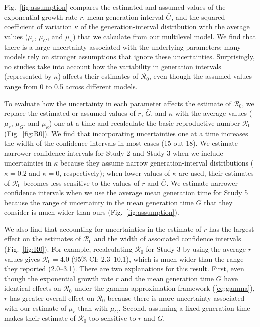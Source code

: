 \documentclass[12pt]{article}
\newcommand{\eref}[1]{(\ref{eq:#1})}
\newcommand{\fref}[1]{Fig.~\ref{fig:#1}}
\begin{document}
\fref{assumption} compares the estimated and assumed values of the exponential growth rate $r$, mean generation interval $\bar G$, and the squared coefficient of variation $\kappa$ of the generation-interval distribution with the average values ($\mu_r$, $\mu_G$, and $\mu_\kappa$) that we calculate from our multilevel model.
We find that there is a large uncertainty associated with the underlying parameters;
many models rely on stronger assumptions that ignore these uncertainties.
Surprisingly, no studies take into account how the variability in generation intervals (represented by $\kappa$) affects their estimates of $\mathcal R_0$, even though the assumed values range from 0 to 0.5 across different models.

To evaluate how the uncertainty in each parameter affects the estimate of $\mathcal R_0$,
we replace the estimated or assumed values of $r$, $\bar G$, and $\kappa$ with the average values ($\mu_r$, $\mu_G$, and $\mu_\kappa$) one at a time and recalculate the basic reproductive number $\mathcal R_0$ (\fref{R0}).
We find that incorporating uncertainties one at a time increases the width of the confidence intervals in most cases (15 out 18).
We estimate narrower confidence intervals for Study 2 and Study 3 when we include uncertainties in $\kappa$ because they assume narrow generation-interval distributions ($\kappa = 0.2$ and $\kappa=0$, respectively);
when lower values of $\kappa$ are used, their estimates of $\mathcal R_0$ becomes less sensitive to the values of $r$ and $\bar G$.
We estimate narrower confidence intervals when we use the average mean generation time for Study 5 because the range of uncertainty in the mean generation time $\bar G$ that they consider is much wider than ours (\fref{assumption}).

We also find that accounting for uncertainties in the estimate of $r$ has the largest effect on the estimates of $\mathcal R_0$ and the width of associated confidence intervals (\fref{R0}).
For example, recalculating $\mathcal R_0$ for Study 3 by using the average $r$ values gives $\mathcal R_0 = 4.0$ (95\% CI: 2.3--10.1), which is much wider than the range they reported (2.0--3.1).
There are two explanations for this result.
First, even though the exponential growth rate $r$ and the mean generation time $\bar G$ have identical effects on $\mathcal R_0$ under the gamma approximation framework \eref{gamma},
$r$ has greater overall effect on $\mathcal R_0$ because there is more uncertainty associated with our estimate of $\mu_r$ than with $\mu_G$.
Second, assuming a fixed generation time makes their estimate of $\mathcal R_0$ too sensitive to $r$ and $\bar G$.
\end{document}
